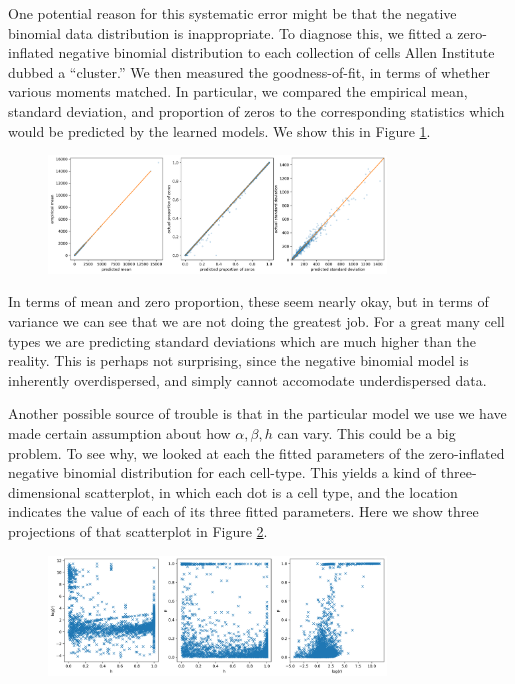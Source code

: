 One potential reason for this systematic error might be that the negative binomial data distribution is inappropriate.  To diagnose this, we fitted a zero-inflated negative binomial distribution to each collection of cells Allen Institute dubbed a ``cluster.''  We then measured the goodness-of-fit, in terms of whether various moments matched.  In particular, we compared the empirical mean, standard deviation, and proportion of zeros to the corresponding statistics which would be predicted by the learned models.  We show this in Figure \ref{fig:zinbfitmatch}.

\begin{figure}
\includegraphics[width=0.8\textwidth]{pics/zinbfitmatch}
\caption{\label{fig:zinbfitmatch}}
\end{figure}

In terms of mean and zero proportion, these seem nearly okay, but in terms of variance we can see that we are not doing the greatest job.  For a great many cell types we are predicting standard deviations which are much higher than the reality.  This is perhaps not surprising, since the negative binomial model is inherently overdispersed, and simply cannot accomodate underdispersed data.  

Another possible source of trouble is that in the particular model we use we have made certain assumption about how $\alpha,\beta,h$ can vary.  This could be a big problem.  To see why, we looked at each the fitted parameters of the zero-inflated negative binomial distribution for each cell-type.  This yields a kind of three-dimensional scatterplot, in which each dot is a cell type, and the location indicates the value of each of its three fitted parameters.  Here we show three projections of that scatterplot in Figure \ref{fig:zinbfitdiversity}.

\begin{figure}
\includegraphics[width=0.8\textwidth]{pics/zinbfitdiversity}
\caption{\label{fig:zinbfitdiversity}}
\end{figure}

